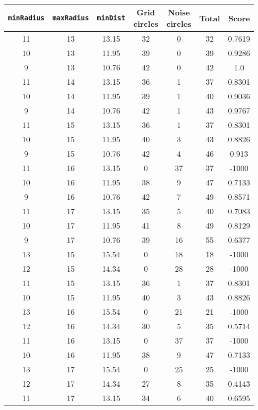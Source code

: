 \documentclass[letterpaper, 12pt]{article}
\begin{document}
\begin{longtable}{|c|c|c|c|c|c|c|}
\hline
\textbf{\texttt{minRadius}} & \textbf{\texttt{maxRadius}} & \textbf{\texttt{minDist}} & \textbf{Grid circles} & \textbf{Noise circles} & \textbf{Total} & \textbf{Score} \\
\hline
11 & 13 & 13.15 & 32 & 0 & 32 & 0.7619 \\
\hline
10 & 13 & 11.95 & 39 & 0 & 39 & 0.9286 \\
\hline
9 & 13 & 10.76 & 42 & 0 & 42 & 1.0 \\
\hline
11 & 14 & 13.15 & 36 & 1 & 37 & 0.8301 \\
\hline
10 & 14 & 11.95 & 39 & 1 & 40 & 0.9036 \\
\hline
9 & 14 & 10.76 & 42 & 1 & 43 & 0.9767 \\
\hline
11 & 15 & 13.15 & 36 & 1 & 37 & 0.8301 \\
\hline
10 & 15 & 11.95 & 40 & 3 & 43 & 0.8826 \\
\hline
9 & 15 & 10.76 & 42 & 4 & 46 & 0.913 \\
\hline
11 & 16 & 13.15 & 0 & 37 & 37 & -1000 \\
\hline
10 & 16 & 11.95 & 38 & 9 & 47 & 0.7133 \\
\hline
9 & 16 & 10.76 & 42 & 7 & 49 & 0.8571 \\
\hline
11 & 17 & 13.15 & 35 & 5 & 40 & 0.7083 \\
\hline
10 & 17 & 11.95 & 41 & 8 & 49 & 0.8129 \\
\hline
9 & 17 & 10.76 & 39 & 16 & 55 & 0.6377 \\
\hline
13 & 15 & 15.54 & 0 & 18 & 18 & -1000 \\
\hline
12 & 15 & 14.34 & 0 & 28 & 28 & -1000 \\
\hline
11 & 15 & 13.15 & 36 & 1 & 37 & 0.8301 \\
\hline
10 & 15 & 11.95 & 40 & 3 & 43 & 0.8826 \\
\hline
13 & 16 & 15.54 & 0 & 21 & 21 & -1000 \\
\hline
12 & 16 & 14.34 & 30 & 5 & 35 & 0.5714 \\
\hline
11 & 16 & 13.15 & 0 & 37 & 37 & -1000 \\
\hline
10 & 16 & 11.95 & 38 & 9 & 47 & 0.7133 \\
\hline
13 & 17 & 15.54 & 0 & 25 & 25 & -1000 \\
\hline
12 & 17 & 14.34 & 27 & 8 & 35 & 0.4143 \\
\hline
11 & 17 & 13.15 & 34 & 6 & 40 & 0.6595 \\
\hline

\end{longtable}
\end{document}
